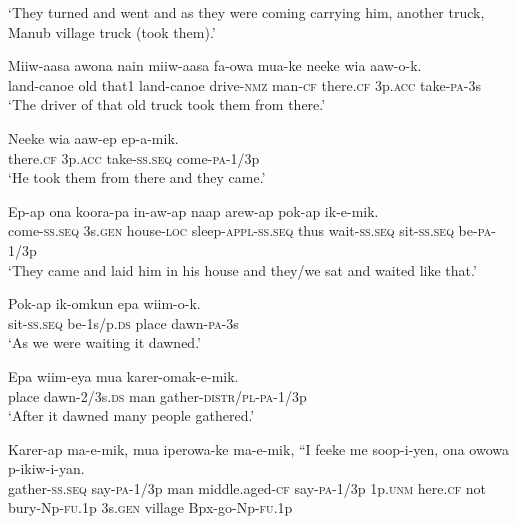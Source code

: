 \glt ‘They turned and went and as they were coming carrying him, another truck, Manub village truck (took them).’ \\
\z


\ea\label{ex:a:x47}
\gll  Miiw-aasa  awona  nain  miiw-aasa  fa-owa  mua-ke  neeke   wia  aaw-o-k. \\
land-canoe  old  that1  land-canoe  drive-\textsc{nmz}  man-\textsc{cf}  there.\textsc{cf}  3p.\textsc{acc}  take-\textsc{pa}-3s \\


\glt ‘The driver of that old truck took them from there.’ \\
\z


\ea\label{ex:a:x48}
\gll  Neeke  wia  aaw-ep  ep-a-mik. \\
there.\textsc{cf}  3p.\textsc{acc}  take-\textsc{ss.seq}  come-\textsc{pa}-1/3p \\
\glt ‘He took them from there and they came.’ \\
\z


\ea\label{ex:a:x49}
\gll  Ep-ap  ona  koora-pa  in-aw-ap  naap              arew-ap  pok-ap  ik-e-mik. \\
come-\textsc{ss.seq}  3s.\textsc{gen}  house-\textsc{loc}  sleep-\textsc{appl}-\textsc{ss.seq}  thus wait-\textsc{ss.seq}  sit-\textsc{ss.seq}  be-\textsc{pa}-1/3p \\


\glt ‘They came and laid him in his house and they/we sat and waited like that.’ \\
\z


\ea\label{ex:a:x50}
\gll  Pok-ap  ik-omkun  epa  wiim-o-k. \\
sit-\textsc{ss.seq}  be-1s/p.\textsc{ds}  place  dawn-\textsc{pa}-3s \\
\glt ‘As we were waiting it dawned.’ \\
\z


\ea\label{ex:a:x51}
\gll  Epa  wiim-eya  mua  karer-omak-e-mik. \\
place  dawn-2/3s.\textsc{ds}  man  gather-\textsc{distr}/\textsc{pl}-\textsc{pa}-1/3p \\
\glt ‘After it dawned many people gathered.’ \\
\z


\ea\label{ex:a:x52}
\gll  Karer-ap  ma-e-mik,  mua  iperowa-ke  ma-e-mik,  “I             feeke  me  soop-i-yen,  ona  owowa  p-ikiw-i-yan. \\
gather-\textsc{ss.seq}  say-\textsc{pa}-1/3p  man  middle.aged-\textsc{cf}  say-\textsc{pa}-1/3p  1p.\textsc{unm}  here.\textsc{cf}  not  bury-Np-\textsc{fu}.1p  3s.\textsc{gen}  village  Bpx-go-Np-\textsc{fu}.1p \\


